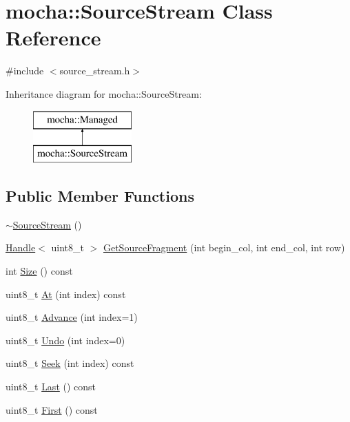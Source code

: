\hypertarget{classmocha_1_1_source_stream}{
\section{mocha::SourceStream Class Reference}
\label{classmocha_1_1_source_stream}
}


{\ttfamily \#include $<$source\_\-stream.h$>$}

Inheritance diagram for mocha::SourceStream:\begin{figure}[H]
\begin{center}
\leavevmode
\includegraphics[height=2.000000cm]{classmocha_1_1_source_stream}
\end{center}
\end{figure}
\subsection*{Public Member Functions}
\begin{DoxyCompactItemize}
\item 
\hyperlink{classmocha_1_1_source_stream_a2958bd7776bbf8ffbda01be0faf30649}{$\sim$SourceStream} ()
\item 
\hyperlink{classmocha_1_1_handle}{Handle}$<$ uint8\_\-t $>$ \hyperlink{classmocha_1_1_source_stream_a3b7b7630bf9631f20ea29e9e7a840d11}{GetSourceFragment} (int begin\_\-col, int end\_\-col, int row)
\item 
int \hyperlink{classmocha_1_1_source_stream_a498a70b15fd0913352c00a03f1c771db}{Size} () const 
\item 
uint8\_\-t \hyperlink{classmocha_1_1_source_stream_ab718622463335568dff394aab118cfa4}{At} (int index) const 
\item 
uint8\_\-t \hyperlink{classmocha_1_1_source_stream_a37645d9d9a65904530f67571a07d7997}{Advance} (int index=1)
\item 
uint8\_\-t \hyperlink{classmocha_1_1_source_stream_a9396e22cbc8ebdbd099b2353bd313718}{Undo} (int index=0)
\item 
uint8\_\-t \hyperlink{classmocha_1_1_source_stream_af4807a44c0baa37ca154d1b30825e201}{Seek} (int index) const 
\item 
uint8\_\-t \hyperlink{classmocha_1_1_source_stream_a6450a6b6d8fabec9a396ff6d0fc305ef}{Last} () const 
\item 
uint8\_\-t \hyperlink{classmocha_1_1_source_stream_a100838d894e109242f43fa8a52f4e540}{First} () const 
\end{DoxyCompactItemize}
